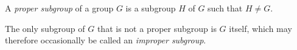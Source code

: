 \documentclass[12pt]{article}
\begin{document}
A \emph{proper subgroup} of a group $G$ 
is a subgroup $H$ of $G$ such that $H\ne G$.

The only subgroup of $G$ that is not a proper subgroup is $G$ itself,
which may therefore occasionally be called an \emph{improper subgroup}.

\end{document}

